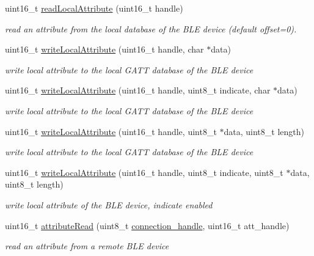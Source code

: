\begin{DoxyCompactItemize}
uint16\+\_\+t \hyperlink{class_wasp_b_l_e_af887bcea2ab060511bb90dd26d29ff3e}{read\+Local\+Attribute} (uint16\+\_\+t handle)
\begin{DoxyCompactList}\small\item\em read an attribute from the local database of the B\+LE device (default offset=0). \end{DoxyCompactList}\item 
uint16\+\_\+t \hyperlink{class_wasp_b_l_e_a80d7997ab8cb1a1c59c5cc0f3a677402}{write\+Local\+Attribute} (uint16\+\_\+t handle, char $\ast$data)
\begin{DoxyCompactList}\small\item\em write local attribute to the local G\+A\+TT database of the B\+LE device \end{DoxyCompactList}\item 
uint16\+\_\+t \hyperlink{class_wasp_b_l_e_a69c09d6cea84a047721c38371c457fe4}{write\+Local\+Attribute} (uint16\+\_\+t handle, uint8\+\_\+t indicate, char $\ast$data)
\begin{DoxyCompactList}\small\item\em write local attribute to the local G\+A\+TT database of the B\+LE device \end{DoxyCompactList}\item 
uint16\+\_\+t \hyperlink{class_wasp_b_l_e_a33eb4201dc496491777c5abefe0d85f2}{write\+Local\+Attribute} (uint16\+\_\+t handle, uint8\+\_\+t $\ast$data, uint8\+\_\+t length)
\begin{DoxyCompactList}\small\item\em write local attribute to the local G\+A\+TT database of the B\+LE device \end{DoxyCompactList}\item 
uint16\+\_\+t \hyperlink{class_wasp_b_l_e_a3b522812954da73015f22d11af470cf3}{write\+Local\+Attribute} (uint16\+\_\+t handle, uint8\+\_\+t indicate, uint8\+\_\+t $\ast$data, uint8\+\_\+t length)
\begin{DoxyCompactList}\small\item\em write local attribute of the B\+LE device, indicate enabled \end{DoxyCompactList}\item 
uint16\+\_\+t \hyperlink{class_wasp_b_l_e_ae2c5400969ec398690a22b418dc282fa}{attribute\+Read} (uint8\+\_\+t \hyperlink{class_wasp_b_l_e_adb324650f5d362e9abb347e9e81be088}{connection\+\_\+handle}, uint16\+\_\+t att\+\_\+handle)
\begin{DoxyCompactList}\small\item\em read an attribute from a remote B\+LE device \end{DoxyCompactList}\item 

\end{DoxyCompactItemize}
